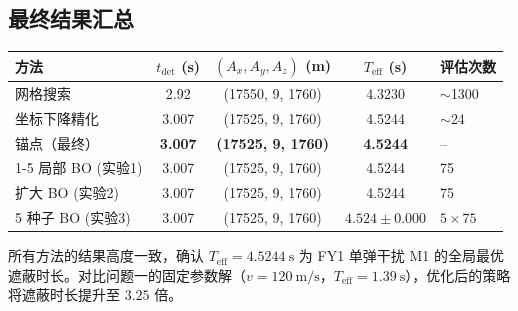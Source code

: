 \documentclass[12pt,a4paper]{ctexart}
\newcommand{\tdet}{t_{\text{det}}}
\newcommand{\Teff}{T_{\text{eff}}}
\begin{document}
\subsection{最终结果汇总}

\begin{center}
\begin{tabular}{lcccl}
\toprule
\textbf{方法} & $\tdet$ (s) & $(A_x, A_y, A_z)$ (m) & $\Teff$ (s) & \textbf{评估次数} \\
\midrule
网格搜索     & 2.92 & (17550, 9, 1760) & 4.3230 & $\sim$1300 \\
坐标下降精化 & 3.007 & (17525, 9, 1760) & 4.5244 & $\sim$24 \\
锚点（最终） & \textbf{3.007} & \textbf{(17525, 9, 1760)} & \textbf{4.5244} & -- \\
\cmidrule{1-5}
局部 BO (实验1) & 3.007 & (17525, 9, 1760) & 4.5244 & 75 \\
扩大 BO (实验2) & 3.007 & (17525, 9, 1760) & 4.5244 & 75 \\
5 种子 BO (实验3) & 3.007 & (17525, 9, 1760) & $4.524 \pm 0.000$ & $5\times75$ \\
\bottomrule
\end{tabular}
\end{center}

所有方法的结果高度一致，确认 $\Teff = 4.5244\ \mathrm{s}$ 为 FY1 单弹干扰 M1 的全局最优遮蔽时长。对比问题一的固定参数解（$v=120\ \mathrm{m/s}$，$\Teff=1.39\ \mathrm{s}$），优化后的策略将遮蔽时长提升至 $3.25$ 倍。
\end{document}
